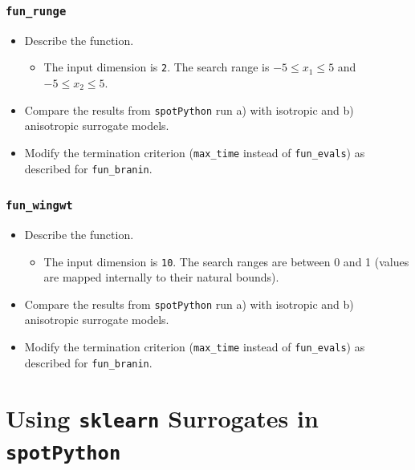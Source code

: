 \documentclass[
  letterpaper,
  DIV=11,
  numbers=noendperiod]{scrreprt}
\providecommand{\tightlist}{%
  \setlength{\itemsep}{0pt}\setlength{\parskip}{0pt}}\usepackage{longtable,booktabs,array}
\begin{document}
\hypertarget{fun_runge}{%
\subsection{\texorpdfstring{\texttt{fun\_runge}}{fun\_runge}}\label{fun_runge}}

\begin{itemize}
\tightlist
\item
  Describe the function.

  \begin{itemize}
  \tightlist
  \item
    The input dimension is \texttt{2}. The search range is
    \(-5 \leq x_1 \leq 5\) and \(-5 \leq x_2 \leq 5\).
  \end{itemize}
\item
  Compare the results from \texttt{spotPython} run a) with isotropic and
  b) anisotropic surrogate models.
\item
  Modify the termination criterion (\texttt{max\_time} instead of
  \texttt{fun\_evals}) as described for \texttt{fun\_branin}.
\end{itemize}

\hypertarget{fun_wingwt}{%
\subsection{\texorpdfstring{\texttt{fun\_wingwt}}{fun\_wingwt}}\label{fun_wingwt}}

\begin{itemize}
\tightlist
\item
  Describe the function.

  \begin{itemize}
  \tightlist
  \item
    The input dimension is \texttt{10}. The search ranges are between 0
    and 1 (values are mapped internally to their natural bounds).
  \end{itemize}
\item
  Compare the results from \texttt{spotPython} run a) with isotropic and
  b) anisotropic surrogate models.
\item
  Modify the termination criterion (\texttt{max\_time} instead of
  \texttt{fun\_evals}) as described for \texttt{fun\_branin}.
\end{itemize}

\hypertarget{sec-sklearn-surrogates}{%
\chapter{\texorpdfstring{Using \texttt{sklearn} Surrogates in
\texttt{spotPython}}{Using sklearn Surrogates in spotPython}}\label{sec-sklearn-surrogates}}
\end{document}
